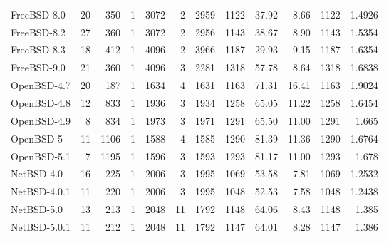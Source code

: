 \documentclass[11pt]{article}
\begin{document}
\begin{center}
\begin{tabular}{lrrrrrrrrrrr}
 FreeBSD-8.0            &     20  &     350  &                  1  &     3072  &     2  &      2959  &       1122  &    37.92  &     8.66  &    1122  &   1.4926  \\
 FreeBSD-8.2            &     27  &     360  &                  1  &     3072  &     2  &      2956  &       1143  &    38.67  &     8.90  &    1143  &   1.5354  \\
 FreeBSD-8.3            &     18  &     412  &                  1  &     4096  &     2  &      3966  &       1187  &    29.93  &     9.15  &    1187  &   1.6354  \\
 FreeBSD-9.0            &     21  &     360  &                  1  &     4096  &     3  &      2281  &       1318  &    57.78  &     8.64  &    1318  &   1.6838  \\
 OpenBSD-4.7            &     20  &     187  &                  1  &     1634  &     4  &      1631  &       1163  &    71.31  &    16.41  &    1163  &   1.9024  \\
 OpenBSD-4.8            &     12  &     833  &                  1  &     1936  &     3  &      1934  &       1258  &    65.05  &    11.22  &    1258  &   1.6454  \\
 OpenBSD-4.9            &      8  &     834  &                  1  &     1973  &     3  &      1971  &       1291  &    65.50  &    11.00  &    1291  &    1.665  \\
 OpenBSD-5              &     11  &    1106  &                  1  &     1588  &     4  &      1585  &       1290  &    81.39  &    11.36  &    1290  &   1.6764  \\
 OpenBSD-5.1            &      7  &    1195  &                  1  &     1596  &     3  &      1593  &       1293  &    81.17  &    11.00  &    1293  &    1.678  \\
 NetBSD-4.0             &     16  &     225  &                  1  &     2006  &     3  &      1995  &       1069  &    53.58  &     7.81  &    1069  &   1.2532  \\
 NetBSD-4.0.1           &     11  &     220  &                  1  &     2006  &     3  &      1995  &       1048  &    52.53  &     7.58  &    1048  &   1.2438  \\
 NetBSD-5.0             &     13  &     213  &                  1  &     2048  &    11  &      1792  &       1148  &    64.06  &     8.43  &    1148  &    1.385  \\
 NetBSD-5.0.1           &     11  &     212  &                  1  &     2048  &    11  &      1792  &       1147  &    64.01  &     8.28  &    1147  &    1.386  \\

\end{tabular}
\end{center}
\end{document}
